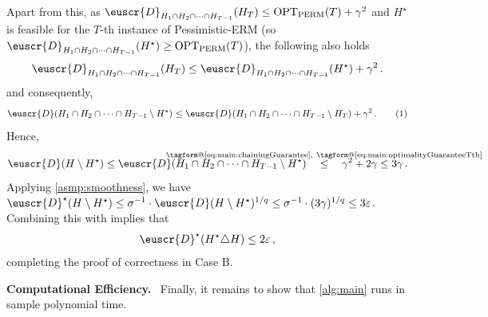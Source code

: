 \documentclass[11pt]{article}
\makeatletter
\theoremstyle{plain}
\theoremstyle{definition}
\theoremstyle{remark}
\newcommand{\yesnum}{\addtocounter{equation}{1}\tag{\theequation}}
\renewcommand{\eqref}[1]{\textup{\eqrefform@{\ref{#1}}}}
\let\eqrefform@\tagform@
\newcommand{\Stackrel}[2]{\stackrel{\mathmakebox[\widthof{\ensuremath{#2}}]{#1}}{#2}}
\newcommand{\opt}{\ensuremath{\mathrm{OPT}}}
\newcommand{\eps}{\varepsilon}
\newcommand{\customcal}[1]{\euscr{#1}}
\newcommand{\cD}{\customcal{D}}
\renewcommand{\paragraph}[1]{\medskip \noindent\textbf{#1}~}
\newcommand{\pERM}{Pessimistic-ERM}
\newcommand{\optset}{{H^\star}}
\newcommand{\cDtrue}{\cD^\star}
\makeatother
\begin{document}
            Apart from this, as $\cD_{H_1\cap H_2\cap \dots \cap H_{T-1}}(H_T)\leq \opt_{\rm PERM}(T)+\gamma^2$ and $\optset$ is feasible for the $T$-th instance of \pERM{} (so $\cD_{H_1\cap H_2\cap \dots \cap H_{T-1}}(\optset)\geq \opt_{\rm PERM}(T)$), the following also holds
            \[
                \cD_{H_1\cap H_2\cap \dots \cap H_{T-1}}(H_T)
                \leq 
                \cD_{H_1\cap H_2\cap \dots \cap H_{T-1}}(\optset)
                + \gamma^2\,.
            \]
            and consequently, 
            \[
                \cD(H_1\cap H_2\cap \dots \cap H_{T-1}\setminus \optset)
                \leq 
                \cD(H_1\cap H_2\cap \dots \cap H_{T-1}\setminus H_T)
                + \gamma^2\,.
                \yesnum\label{eq:main:optimalityGuaranteeTth}
            \]
            Hence,
            \[
                \cD(H \setminus \optset)
                \leq 
                \cD(H_1\cap H_2\cap \dots \cap H_{T-1}\setminus \optset)
                ~~~\Stackrel{\eqref{eq:main:chainingGuarantee},~\eqref{eq:main:optimalityGuaranteeTth}}{\leq}~~~  
                \gamma^2 + 2\gamma
                \leq 3\gamma\,.
            \]
        Applying \cref{asmp:smoothness}, we have $\cDtrue(H \setminus \optset) \leq \sigma^{-1} \cdot \cD(H \setminus \optset)^{1/q} \leq \sigma^{-1} \cdot (3\gamma)^{1/q}\leq 3\eps$. 
        Combining this with \eqref{eq:computational:caseB} implies that 
        \[
            \cDtrue(\optset\triangle H)\leq 2\eps\,,
        \]
        completing the proof of correctness in Case B.
        
    

    \paragraph{Computational Efficiency.}
        Finally, it remains to show that \cref{alg:main} runs in sample polynomial time.
        
\end{document}
